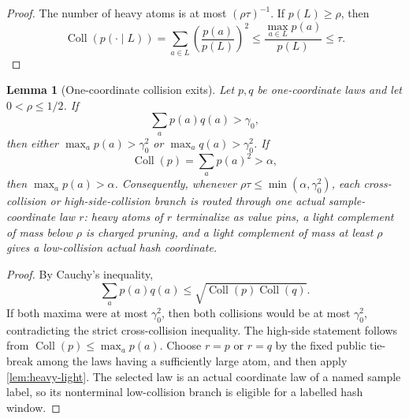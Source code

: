 \documentclass[11pt]{article}
\newcommand{\Cref}[1]{\ref{#1}}
\newtheorem{lemma}[theorem]{Lemma}
\theoremstyle{remark}
\newcommand{\Coll}{\operatorname{Coll}}
\begin{document}
\begin{proof}
The number of heavy atoms is at most $(\rho\tau)^{-1}$.  If $p(L)\ge\rho$, then
\[
        \Coll(p(\cdot\mid L))=\sum_{a\in L}\left(\frac{p(a)}{p(L)}\right)^2
        \le \frac{\max_{a\in L}p(a)}{p(L)}\le \tau.
\]
\end{proof}


\begin{lemma}[One-coordinate collision exits]\label{lem:collision-exit}
Let $p,q$ be one-coordinate laws and let $0<\rho\le 1/2$.  If
\[
        \sum_a p(a)q(a)>\gamma_0,
\]
then either $\max_a p(a)>\gamma_0^2$ or $\max_a q(a)>\gamma_0^2$.  If
\[
        \Coll(p)=\sum_a p(a)^2>\alpha,
\]
then $\max_a p(a)>\alpha$.  Consequently, whenever $\rho\tau\le\min(\alpha,\gamma_0^2)$, each cross-collision or high-side-collision branch is routed through one actual sample-coordinate law $r$: heavy atoms of $r$ terminalize as value pins, a light complement of mass below $\rho$ is charged pruning, and a light complement of mass at least $\rho$ gives a low-collision actual hash coordinate.
\end{lemma}

\begin{proof}
By Cauchy's inequality,
\[
        \sum_a p(a)q(a)\le \sqrt{\Coll(p)\Coll(q)}.
\]
If both maxima were at most $\gamma_0^2$, then both collisions would be at most $\gamma_0^2$, contradicting the strict cross-collision inequality.  The high-side statement follows from $\Coll(p)\le\max_a p(a)$.  Choose $r=p$ or $r=q$ by the fixed public tie-break among the laws having a sufficiently large atom, and then apply \Cref{lem:heavy-light}.  The selected law is an actual coordinate law of a named sample label, so its nonterminal low-collision branch is eligible for a labelled hash window.
\end{proof}
\end{document}
